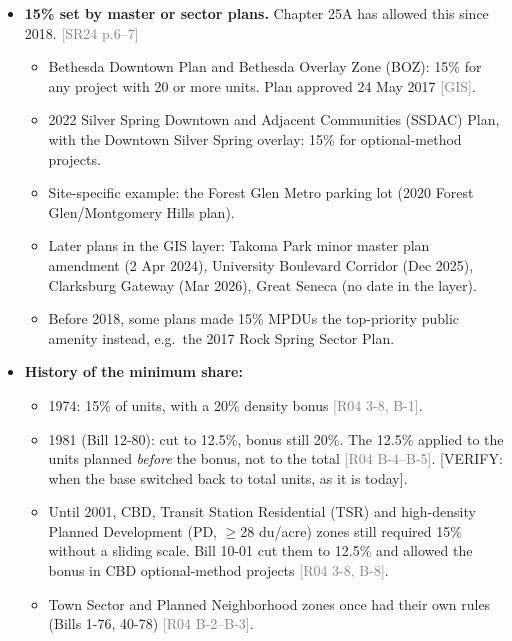 \documentclass[11pt]{article}
\newcommand{\verify}[1]{\textcolor{red!70!black}{[VERIFY: #1]}}
\newcommand{\src}[1]{\textcolor{gray}{\small[#1]}}
\begin{document}
\begin{itemize}
    The core (Bethesda/Chevy Chase, Darnestown, Lower Seneca, North Bethesda, Potomac, Travilah) appears every year. Areas at the margin enter and leave, which gives cross-time variation within an area.
  \item \textbf{15\% set by master or sector plans.} Chapter 25A has allowed this since 2018. \src{SR24 p.6--7}
    \begin{itemize}
      \item Bethesda Downtown Plan and Bethesda Overlay Zone (BOZ): 15\% for any project with 20 or more units. Plan approved 24 May 2017 \src{GIS}.
      \item 2022 Silver Spring Downtown and Adjacent Communities (SSDAC) Plan, with the Downtown Silver Spring overlay: 15\% for optional-method projects.
      \item Site-specific example: the Forest Glen Metro parking lot (2020 Forest Glen/Montgomery Hills plan).
      \item Later plans in the GIS layer: Takoma Park minor master plan amendment (2 Apr 2024), University Boulevard Corridor (Dec 2025), Clarksburg Gateway (Mar 2026), Great Seneca (no date in the layer).
      \item Before 2018, some plans made 15\% MPDUs the top-priority public amenity instead, e.g.\ the 2017 Rock Spring Sector Plan.
    \end{itemize}
  \item \textbf{History of the minimum share:}
    \begin{itemize}
      \item 1974: 15\% of units, with a 20\% density bonus \src{R04 3-8, B-1}.
      \item 1981 (Bill 12-80): cut to 12.5\%, bonus still 20\%. The 12.5\% applied to the units planned \emph{before} the bonus, not to the total \src{R04 B-4--B-5}. \verify{when the base switched back to total units, as it is today}.
      \item Until 2001, CBD, Transit Station Residential (TSR) and high-density Planned Development (PD, $\geq$28 du/acre) zones still required 15\% without a sliding scale. Bill 10-01 cut them to 12.5\% and allowed the bonus in CBD optional-method projects \src{R04 3-8, B-8}.
      \item Town Sector and Planned Neighborhood zones once had their own rules (Bills 1-76, 40-78) \src{R04 B-2--B-3}.
    \end{itemize}
\end{itemize}

\end{document}
